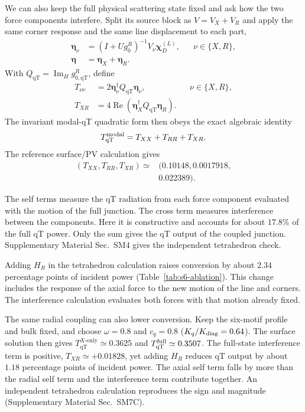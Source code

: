 \documentclass[10pt,aps,onecolumn,floatfix,notitlepage,nofootinbib,showkeys]{revtex4-2}
\newcommand{\vchi}{\bm{\chi}}
\newcommand{\veta}{\bm{\eta}}
\newcommand{\qT}{\mathrm{qT}}
\newcommand{\ImH}{\operatorname{Im}_{\!H}}
\begin{document}
We can also keep the full physical scattering state fixed and ask how the two force components interfere. Split its source block as $V=V_X+V_R$ and apply the same corner response and the same line displacement to each part,
\begin{equation}
\begin{aligned}
  \veta_\nu&=(I+Ug_0^R)^{-1}V_\nu\vchi_D^{(L)},
  &&\nu\in\{X,R\},\\
  \veta&=\veta_X+\veta_R.
\end{aligned}
  \label{eq:s6-same-state-source}
\end{equation}
With $Q_{\qT}=\ImH g_{0,\qT}^R$, define
\begin{equation}
\begin{aligned}
  T_{\nu\nu}&=2\veta_\nu^\dagger Q_{\qT}\veta_\nu,
  &&\nu\in\{X,R\},\\
  T_{XR}&=4\operatorname{Re}
  \left(\veta_X^\dagger Q_{\qT}\veta_R\right).
\end{aligned}
  \label{eq:s6-same-state-terms}
\end{equation}
The invariant modal-qT quadratic form then obeys the exact algebraic identity
\begin{equation}
 T_{\qT}^{\rm modal}=T_{XX}+T_{RR}+T_{XR}.
 \label{eq:s6-same-state-XR}
\end{equation}
The reference surface/PV calculation gives
\begin{equation}
 \begin{split}
 (T_{XX},T_{RR},T_{XR})\simeq{}&
 (0.10148,0.0017918,\\
 &0.022389).
 \end{split}
\end{equation}

The self terms measure the qT radiation from each force component evaluated with the motion of the full junction. The cross term measures interference between the components. Here it is constructive and accounts for about $17.8\%$ of the full qT power. Only the sum gives the qT output of the coupled junction. Supplementary Material Sec.~SM4 gives the independent tetrahedron check.

Adding $H_R$ in the tetrahedron calculation raises conversion by about $2.34$ percentage points of incident power (Table~\ref{tab:s6-ablation}). This change includes the response of the axial force to the new motion of the line and corners. The interference calculation evaluates both forces with that motion already fixed.

The same radial coupling can also lower conversion. Keep the six-motif profile and bulk fixed, and choose $\omega=0.8$ and $c_q=0.8$ ($K_q/K_{\rm diag}=0.64$). The surface solution then gives $T_{\qT}^{X\text{-only}}\simeq0.3625$ and $T_{\qT}^{\rm full}\simeq0.3507$. The full-state interference term is positive, $T_{XR}\simeq+0.01828$, yet adding $H_R$ reduces qT output by about $1.18$ percentage points of incident power. The axial self term falls by more than the radial self term and the interference term contribute together. An independent tetrahedron calculation reproduces the sign and magnitude (Supplementary Material Sec.~SM7C).
\end{document}
